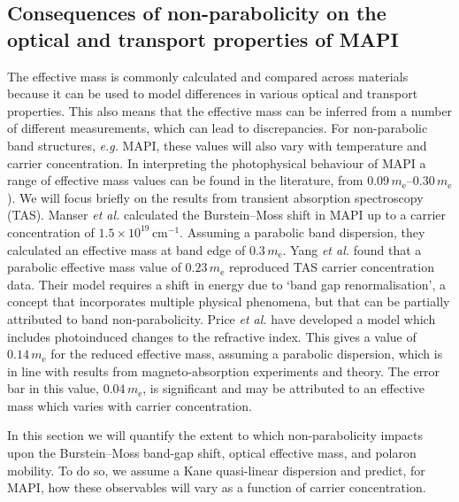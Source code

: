 \subsection{Consequences of non-parabolicity on the optical and transport properties of MAPI}

The effective mass is commonly calculated and compared across materials because it can be used to model differences in various optical and transport properties.
This also means that the effective mass can be inferred from a number of different measurements, which can lead to discrepancies.
For non-parabolic band structures, \textit{e.g.} MAPI, these values will also vary with temperature and carrier concentration.
In interpreting the photophysical behaviour of MAPI a range of effective mass values can be found in the literature, from $0.09\,m_{\text{e}}$--$0.30\,m_{\text{e}}$).\autocite{Miyata2015,Tanaka2003,Hirasawa1994,Yang2015,Manser2014,Price2015}
We will focus briefly on the results from transient absorption spectroscopy (TAS).
Manser \textit{et al.} calculated the Burstein--Moss shift in MAPI up to a carrier concentration of $1.5 \times 10^{19}\,\mathrm{cm}^{-1}$.\autocite{Manser2014} Assuming a parabolic band dispersion, they calculated an effective mass at band edge of $0.3\,m_{\text{e}}$.
Yang \textit{et al.} found that a parabolic effective mass value of $0.23\,m_{\text{e}}$ reproduced TAS carrier concentration data.\autocite{Yang2015} Their model requires a shift in energy due to `band gap renormalisation', a concept that incorporates multiple physical phenomena, but that can be partially attributed to band non-parabolicity.\autocite{Walsh2008}
Price \textit{et al.} have developed a model which includes photoinduced changes to the refractive index.\autocite{Price2015} This gives a value of $0.14\,m_{\text{e}}$ for the reduced effective mass, assuming a parabolic dispersion, which is in line with results from magneto-absorption experiments\autocite{Miyata2015,Tanaka2003,Hirasawa1994} and theory.\autocite{Brivio2014,Umari2014} 
The error bar in this value, $0.04\,m_{\text{e}}$, is significant and may be attributed to an effective mass which varies with carrier concentration.

In this section we will quantify the extent to which non-parabolicity impacts upon the Burstein--Moss band-gap shift, optical effective mass, and polaron mobility.
To do so, we assume a Kane quasi-linear dispersion and predict, for MAPI, how these observables will vary as a function of carrier concentration.

